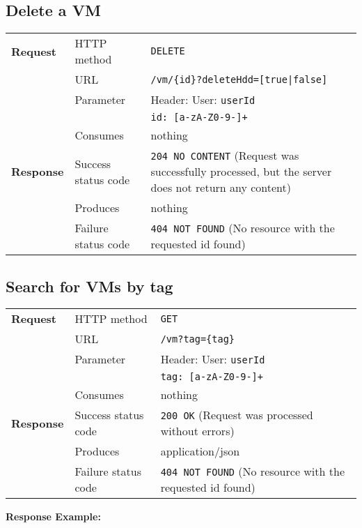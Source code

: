 \subsection{Delete a VM} %

\begin{center}
	\begin{tabularx}{\textwidth}{llX} 
	    \toprule
					\textbf{Request}        &   HTTP method             &   \texttt{DELETE}			\tabularnewline
		                        			&   URL                     &   \texttt{/vm/\{id\}?deleteHdd=[true|false]}           	\tabularnewline
									& Parameter & Header: User: \texttt{userId} \tabularnewline
													& & \texttt{id: [a-zA-Z0-9-]+} \tabularnewline
                                  &   Consumes                &   nothing					      	\tabularnewline \midrule                       
          \textbf{Response}       &   Success status code     &   \texttt{204 NO CONTENT} (Request was successfully processed, but the server does not return any content) 	\tabularnewline
                                  &   Produces                &   nothing								\tabularnewline
                                  &   Failure status code     &   \texttt{404 NOT FOUND} (No resource with the requested id found)	\tabularnewline
           \bottomrule
	\end{tabularx}
\end{center}
\pagebreak[3] 	
\pagebreak[3]


\subsection{Search for VMs by tag} %

\begin{center}
	\begin{tabularx}{\textwidth}{llX} 
	    \toprule
					\textbf{Request}        &   HTTP method             &   \texttt{GET}			\tabularnewline
		                        			&   URL                     &   \texttt{/vm?tag=\{tag\}}           	\tabularnewline
									& Parameter & Header: User: \texttt{userId} \tabularnewline
													& & \texttt{tag: [a-zA-Z0-9-]+} \tabularnewline
                                  &   Consumes                &   nothing					      	\tabularnewline \midrule                       
          \textbf{Response}       &   Success status code     &   \texttt{200 OK} (Request was processed without errors) 	\tabularnewline
                                  &   Produces                &   application/json								\tabularnewline
                                  &   Failure status code     &   \texttt{404 NOT FOUND} (No resource with the requested id found)	\tabularnewline
           \bottomrule
	\end{tabularx}
\end{center}
\pagebreak[3] 	
\pagebreak[3]
		\textbf{Response Example:}
		


